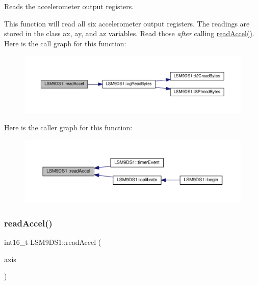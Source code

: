Reads the accelerometer output registers. 

This function will read all six accelerometer output registers. The readings are stored in the class\textquotesingle{} ax, ay, and az variables. Read those {\itshape after} calling \hyperlink{classLSM9DS1_a9953684a1ff652a7d3a4d91e72bccaa1}{read\+Accel()}. Here is the call graph for this function\+:
\nopagebreak
\begin{figure}[H]
\begin{center}
\leavevmode
\includegraphics[width=350pt]{classLSM9DS1_a9953684a1ff652a7d3a4d91e72bccaa1_cgraph}
\end{center}
\end{figure}
Here is the caller graph for this function\+:
\nopagebreak
\begin{figure}[H]
\begin{center}
\leavevmode
\includegraphics[width=350pt]{classLSM9DS1_a9953684a1ff652a7d3a4d91e72bccaa1_icgraph}
\end{center}
\end{figure}
\mbox{\label{classLSM9DS1_acbe3bfc0b8db7fe3f77893d22c394594}} 
\subsubsection{\texorpdfstring{read\+Accel()}{readAccel()}\hspace{0.1cm}{\footnotesize\ttfamily [2/2]}}
{\footnotesize\ttfamily int16\+\_\+t L\+S\+M9\+D\+S1\+::read\+Accel (\begin{DoxyParamCaption}\item[{lsm9ds1\+\_\+axis}]{axis }\end{DoxyParamCaption})}



